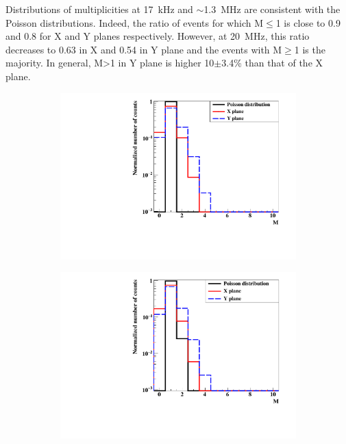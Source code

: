 \documentclass[a4paper,11pt]{article}
\begin{document}
Distributions of multiplicities at 17~kHz and $\sim$1.3~MHz are consistent with the Poisson distributions. Indeed, the ratio of events for which M$\leq$1 is close to 0.9 and 0.8 for X and Y planes respectively. However, at 20~MHz, this ratio decreases to 0.63 in X and 0.54 in Y plane and the events with M$\geq$1 is the majority. In general, M>1 in Y plane is higher 10$\pm$3.4\% than that of the X plane.
\begin{figure}[htb]
\centering
    \begin{subfigure}{0.32\textwidth} \centering \includegraphics[width=\textwidth]{figures/Involved_fibers_17kHz_without_X=0.pdf} \caption{} \label{fig:Fibers_17kHz}
    \end{subfigure}
    \begin{subfigure}{0.32\textwidth} \centering \includegraphics[width=\textwidth]{figures/Involved_fibers_1MHz_without_X=0.pdf} \caption{} \label{fig:Fibers_1MHz}

\end{subfigure}
\end{figure}
\end{document}

